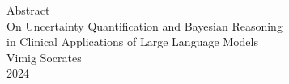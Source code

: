 \begin{center}
	Abstract\\
	On Uncertainty Quantification and Bayesian Reasoning \\ in Clinical Applications of Large Language Models \\
	Vimig Socrates \\
	2024
\end{center}

\begin{spacing}{2}
	
	 

\end{spacing}

